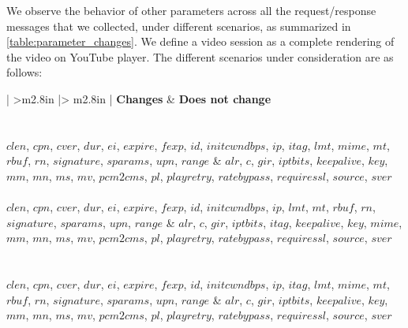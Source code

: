 We observe the behavior of other parameters across all the request/response messages that we collected, under different scenarios, as summarized in \fig\ref{table:parameter_changes}. We define a video session as a complete rendering of the video on YouTube player. The different scenarios under consideration are as follows:



\begin{table}[!t]
	\centering
	\scriptsize
	\caption{Classification of DASH Parameters based on Their Behaviors}
	\label{table:parameter_changes}
	\begin{tabular}{ | >{\centering\arraybackslash}m{2.8in} |> {\centering\arraybackslash}m{2.8in} | }
		\hline
		\textbf{Changes} & \textbf{Does not change} \\ \hline
		  \\ \hline
		  \\ \hline
		$clen$, $cpn$, $cver$, $dur$, $ei$, $expire$, $fexp$, $id$, $initcwndbps$, $ip$, $itag$, $lmt$, $mime$, $mt$, $rbuf$, $rn$, $signature$, $sparams$, $upn$, $range$ & $alr$, $c$, $gir$, $iptbits$, $keepalive$, $key$, $mm$, $mn$, $ms$, $mv$, $pcm2cms$, $pl$, $playretry$, $ratebypass$, $requiressl$, $source$, $sver$ \\ \hline
		  \\ \hline
		$clen$, $cpn$, $cver$, $dur$, $ei$, $expire$, $fexp$, $id$, $initcwndbps$, $ip$, $lmt$, $mt$, $rbuf$, $rn$, $signature$, $sparams$, $upn$, $range$ & $alr$, $c$, $gir$, $iptbits$, $itag$, $keepalive$, $key$, $mime$, $mm$, $mn$, $ms$, $mv$, $pcm2cms$, $pl$, $playretry$, $ratebypass$, $requiressl$, $source$, $sver$ \\ \hline
		  \\ \hline
		  \\ \hline
		$clen$, $cpn$, $cver$, $dur$, $ei$, $expire$, $fexp$, $id$, $initcwndbps$, $ip$, $itag$, $lmt$, $mime$, $mt$, $rbuf$, $rn$, $signature$, $sparams$, $upn$, $range$ & $alr$, $c$, $gir$, $iptbits$, $keepalive$, $key$, $mm$, $mn$, $ms$, $mv$, $pcm2cms$, $pl$, $playretry$, $ratebypass$, $requiressl$, $source$, $sver$ \\ \hline

\end{tabular}
\end{table}
